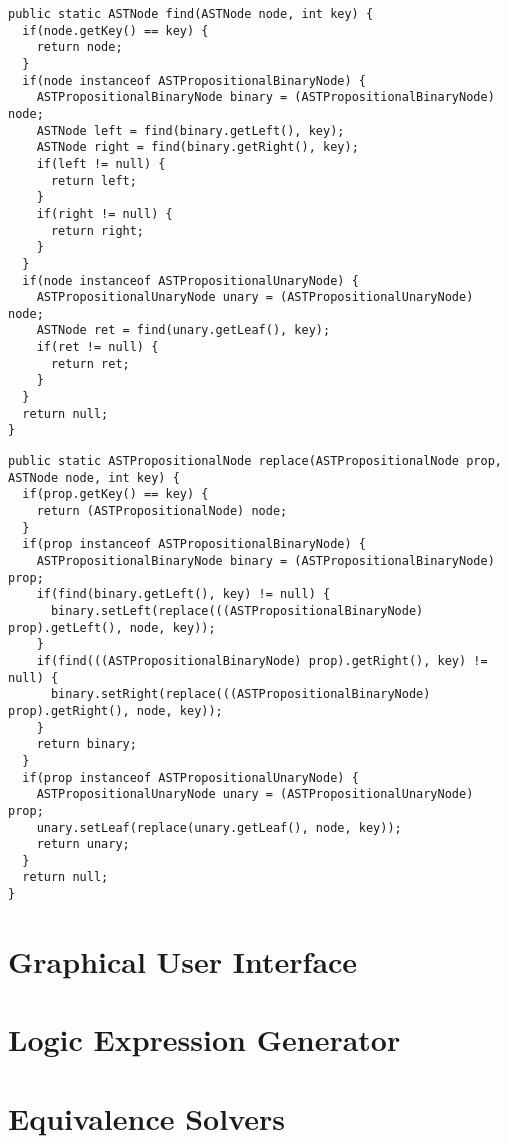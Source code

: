 \documentclass{report}
\begin{document}
\begin{lstlisting}[caption=Find method for equivalences, label=find]
public static ASTNode find(ASTNode node, int key) {
  if(node.getKey() == key) {
    return node;
  }
  if(node instanceof ASTPropositionalBinaryNode) {
    ASTPropositionalBinaryNode binary = (ASTPropositionalBinaryNode) node;
    ASTNode left = find(binary.getLeft(), key);
    ASTNode right = find(binary.getRight(), key);
    if(left != null) {
      return left;
    }
    if(right != null) {
      return right;
    }
  }
  if(node instanceof ASTPropositionalUnaryNode) {
    ASTPropositionalUnaryNode unary = (ASTPropositionalUnaryNode) node;
    ASTNode ret = find(unary.getLeaf(), key);
    if(ret != null) {
      return ret;
    }
  }
  return null;
}
\end{lstlisting}

\begin{lstlisting}[caption=Replace method for equivalences, label=replace]
public static ASTPropositionalNode replace(ASTPropositionalNode prop, ASTNode node, int key) {
  if(prop.getKey() == key) {
    return (ASTPropositionalNode) node;
  }
  if(prop instanceof ASTPropositionalBinaryNode) {
    ASTPropositionalBinaryNode binary = (ASTPropositionalBinaryNode) prop;
    if(find(binary.getLeft(), key) != null) {
      binary.setLeft(replace(((ASTPropositionalBinaryNode) prop).getLeft(), node, key));
    }
    if(find(((ASTPropositionalBinaryNode) prop).getRight(), key) != null) {
      binary.setRight(replace(((ASTPropositionalBinaryNode) prop).getRight(), node, key));
    }
    return binary;
  }
  if(prop instanceof ASTPropositionalUnaryNode) {
    ASTPropositionalUnaryNode unary = (ASTPropositionalUnaryNode) prop;
    unary.setLeaf(replace(unary.getLeaf(), node, key));
    return unary;
  }
  return null;
}
\end{lstlisting}

\section{Graphical User Interface}

\section{Logic Expression Generator}

\section{Equivalence Solvers}
\end{document}
